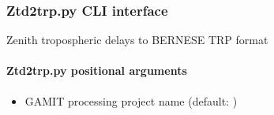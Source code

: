 \documentclass[letterpaper,10pt,english]{sphinxmanual}
\begin{document}
\begin{fulllineitems}
\label{\detokenize{com:com.Ztd2trp.main}}
\pysigstartsignatures
{}
\pysigstopsignatures
\end{fulllineitems}



\subsubsection{Ztd2trp.py \sphinxhyphen{} CLI interface}
\label{\detokenize{com:Ztd2trp.py---CLI-interface}}
\sphinxAtStartPar
Zenith tropospheric delays to BERNESE TRP format

\begin{sphinxVerbatim}[commandchars=\\\{\}]
 \PYG{p}{[}\PYG{p}{]} \PYG{p}{[}\PYG{p}{]} \PYG{p}{[}\PYG{p}{]} \PYG{p}{[}  \PYG{p}{[} \PYG{p}{]}\PYG{p}{]}
           \PYG{p}{[} \PYG{p}{]}
\end{sphinxVerbatim}


\paragraph{Ztd2trp.py positional arguments}
\label{\detokenize{com:Ztd2trp.py-positional-arguments}}\begin{itemize}
\item {} 
\sphinxAtStartPar
{\hyperref[\detokenize{com:Ztd2trp.py-project_name}]{}} \sphinxhyphen{} GAMIT processing project name (default: )

\end{itemize}
\end{document}
